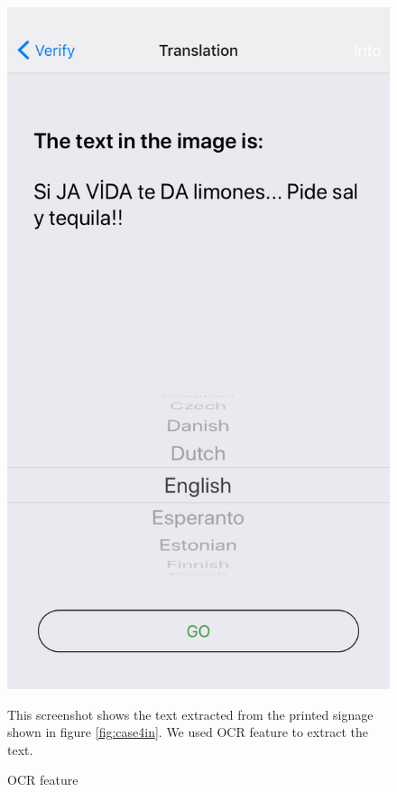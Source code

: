 \documentclass[12pt]{article}
\begin{document}
\begin{figure} [H]
\begin{minipage}{.5\textwidth}
  \includegraphics[width=0.9\linewidth]{media/case4a.png}
  \caption{OCR feature}{This screenshot shows the text extracted from the printed signage shown in figure \ref{fig:case4in}. We used OCR feature to extract the text.}
  \label{fig:case4}
\end{minipage}
\end{figure}
\end{document}
